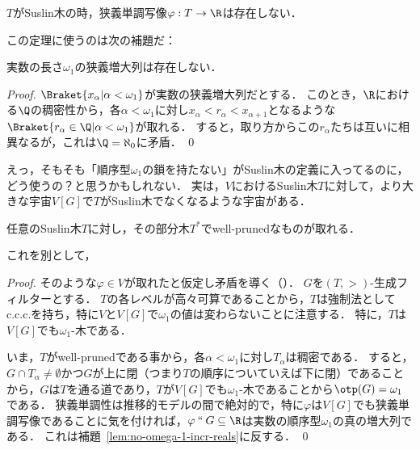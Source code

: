 \documentclass[a4j,leqno]{ltjsarticle}
\renewcommand{\emph}[1]{\textsf{\textgt{#1}}}
\begin{document}
\begin{theorem}
 $T$がSuslin木の時，狭義単調写像$\varphi: T \rightarrow \R$は存在しない．
\end{theorem}

この定理に使うのは次の補題だ：

\begin{lemma}\label{lem:no-omega-1-incr-reals}
 実数の長さ$\omega_1$の狭義増大列は存在しない．
\end{lemma}
\begin{proof}
 $\Braket{x_\alpha | \alpha < \omega_1}$が実数の狭義増大列だとする．
 このとき，$\R$における$\Q$の稠密性から，各$\alpha < \omega_1$に対し$x_\alpha < r_\alpha < x_{\alpha+1}$となるような$\Braket{ r_\alpha \in \Q | \alpha < \omega_1}$が取れる．
 すると，取り方からこの$r_\alpha$たちは互いに相異なるが，これは$\Q = \aleph_0$に矛盾． \qed
\end{proof}

えっ，そもそも「順序型$\omega_1$の鎖を持たない」がSuslin木の定義に入ってるのに，どう使うの？と思うかもしれない．
実は，$V$におけるSuslin木$T$に対して，より大きな宇宙$V[G]$で$T$がSuslin木でなくなるような宇宙がある．

\begin{fact}
 任意のSuslin木$T$に対し，その部分木$T^*$でwell-prunedなものが取れる．
\end{fact}

これを別として，

\begin{proof}
 そのような$\varphi \in V$が取れたと仮定し矛盾を導く（\emph{背理法}）．
 $G$を$(T, >)$-生成フィルターとする．
 $T$の各レベルが高々可算であることから，$T$は強制法としてc.c.c.を持ち，特に$V$と$V[G]$で$\omega_1$の値は変わらないことに注意する．
 特に，$T$は$V[G]$でも$\omega_1$-木である．

 いま，$T$がwell-prunedである事から，各$\alpha < \omega_1$に対し$T_\alpha$は稠密である．
 すると，$G \cap T_\alpha \neq \emptyset$かつ$G$が上に閉（つまり$T$の順序についていえば下に閉）であることから，$G$は$T$を通る道であり，$T$が$V[G]$でも$\omega_1$-木であることから$\otp(G) = \omega_1$である．
 狭義単調性は推移的モデルの間で絶対的で，特に$\varphi$は$V[G]$でも狭義単調写像であることに気を付ければ，$\varphi \mathbin{\text{``}} G \subseteq \R$は実数の順序型$\omega_1$の真の増大列である．
 これは補題~\ref{lem:no-omega-1-incr-reals}に反する． \qed
\end{proof}

\printbibliography[title=参考文献]
\end{document}
